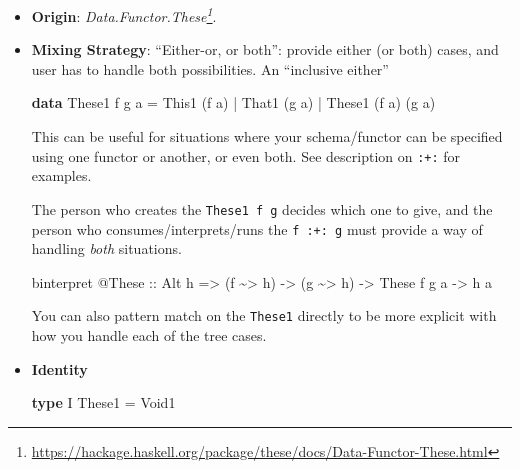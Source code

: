 \documentclass[]{article}
\newenvironment{Shaded}{}{}
\newcommand{\DataTypeTok}[1]{\textcolor[rgb]{0.56,0.13,0.00}{#1}}
\newcommand{\KeywordTok}[1]{\textcolor[rgb]{0.00,0.44,0.13}{\textbf{#1}}}
\newcommand{\NormalTok}[1]{#1}
\newcommand{\OperatorTok}[1]{\textcolor[rgb]{0.40,0.40,0.40}{#1}}
\newcommand{\OtherTok}[1]{\textcolor[rgb]{0.00,0.44,0.13}{#1}}
\renewcommand{\href}[2]{#2\footnote{\url{#1}}}
\begin{document}
\begin{itemize}
\item
  \textbf{Origin}:
  \emph{\href{https://hackage.haskell.org/package/these/docs/Data-Functor-These.html}{Data.Functor.These}}.
\item
  \textbf{Mixing Strategy}: ``Either-or, or both'': provide either (or both)
  cases, and user has to handle both possibilities. An ``inclusive either''

\begin{Shaded}
\begin{Highlighting}[]
\KeywordTok{data} \DataTypeTok{These1}\NormalTok{ f g a}
    \OtherTok{=} \DataTypeTok{This1}\NormalTok{  (f a)}
    \OperatorTok{|} \DataTypeTok{That1}\NormalTok{        (g a)}
    \OperatorTok{|} \DataTypeTok{These1}\NormalTok{ (f a) (g a)}
\end{Highlighting}
\end{Shaded}

  This can be useful for situations where your schema/functor can be specified
  using one functor or another, or even both. See description on \texttt{:+:}
  for examples.

  The person who creates the \texttt{These1\ f\ g} decides which one to give,
  and the person who consumes/interprets/runs the \texttt{f\ :+:\ g} must
  provide a way of handling \emph{both} situations.

\begin{Shaded}
\begin{Highlighting}[]
\NormalTok{binterpret }\OperatorTok{@}\DataTypeTok{These}
\OtherTok{    ::} \DataTypeTok{Alt}\NormalTok{ h}
    \OtherTok{=>}\NormalTok{ (f }\OperatorTok{\textasciitilde{}>}\NormalTok{ h)}
    \OtherTok{{-}>}\NormalTok{ (g }\OperatorTok{\textasciitilde{}>}\NormalTok{ h)}
    \OtherTok{{-}>} \DataTypeTok{These}\NormalTok{ f g a}
    \OtherTok{{-}>}\NormalTok{ h a}
\end{Highlighting}
\end{Shaded}

  You can also pattern match on the \texttt{These1} directly to be more explicit
  with how you handle each of the tree cases.
\item
  \textbf{Identity}

\begin{Shaded}
\begin{Highlighting}[]
\KeywordTok{type} \DataTypeTok{I} \DataTypeTok{These1} \OtherTok{=} \DataTypeTok{Void1}
\end{Highlighting}
\end{Shaded}


\end{itemize}
\end{document}
